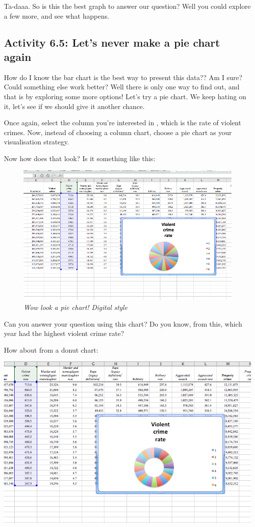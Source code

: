 \documentclass[
]{book}
\begin{document}
Ta-daaa. So is this the best graph to answer our question? Well you could explore a few more, and see what happens.

\hypertarget{activity-6.5-lets-never-make-a-pie-chart-again}{%
\subsection{Activity 6.5: Let's never make a pie chart again}\label{activity-6.5-lets-never-make-a-pie-chart-again}}

How do I know the bar chart is the best way to present this data?? Am I sure? Could something else work better? Well there is only one way to find out, and that is by exploring some more options! Let's try a pie chart. We keep hating on it, let's see if we should give it another chance.

Once again, select the column you're interested in , which is the rate of violent crimes. Now, instead of choosing a column chart, choose a pie chart as your visualisation strategy.

Now how does that look? Is it something like this:

\begin{figure}
\centering
\includegraphics{imgs/desc_viz_pie.png}
\caption{\emph{Wow look a pie chart! Digital style}}
\end{figure}

Can you answer your question using this chart? Do you know, from this, which year had the highest violent crime rate?

How about from a donut chart:

\includegraphics{imgs/desc_viz_donut.png}
\end{document}
